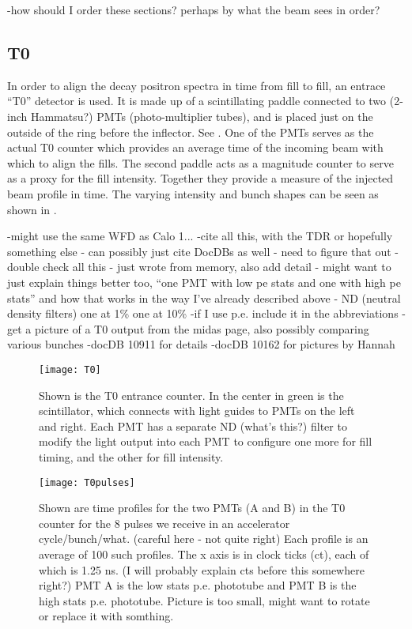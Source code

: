 -how should I order these sections? perhaps by what the beam sees in order?

\subsection{T0}
\label{sec:T0}

In order to align the decay positron spectra in time from fill to fill, an entrace ``T0'' detector is used.  It is made up of a scintillating paddle connected to two (2-inch Hammatsu?) PMTs (photo-multiplier tubes), and is placed just on the outside of the ring before the inflector. See . One of the PMTs serves as the actual T0 counter which provides an average time of the incoming beam with which to align the fills. The second paddle acts as a magnitude counter to serve as a proxy for the fill intensity. Together they provide a measure of the injected beam profile in time. The varying intensity and bunch shapes can be seen as shown in .

-might use the same WFD as Calo 1...
-cite all this, with the TDR or hopefully something else \cite{TDR} - can possibly just cite DocDBs as well - need to figure that out
-double check all this - just wrote from memory, also add detail - might want to just explain things better too, ``one PMT with low pe stats and one with high pe stats'' and how that works in the way I've already described above - ND (neutral density filters) one at 1\% one at 10\%
-if I use p.e. include it in the abbreviations
-get a picture of a T0 output from the midas page, also possibly comparing various bunches
-docDB 10911 for details
-docDB 10162 for pictures by Hannah


\begin{figure}[]
    \centering
    \texttt{[image: T0]}
    \caption[T0 Counter]{Shown is the T0 entrance counter. In the center in green is the scintillator, which connects with light guides to PMTs on the left and right. Each PMT has a separate ND (what's this?) filter to modify the light output into each PMT to configure one more for fill timing, and the other for fill intensity.}
    \label{fig:T0}
\end{figure}

\begin{figure}[]
    \centering
    \texttt{[image: T0pulses]}
    \caption[T0 Pulses]{Shown are time profiles for the two PMTs (A and B) in the T0 counter for the 8 pulses we receive in an accelerator cycle/bunch/what. (careful here - not quite right) Each profile is an average of 100 such profiles. The x axis is in clock ticks (ct), each of which is 1.25 ns. (I will probably explain cts before this somewhere right?) PMT A is the low stats p.e. phototube and PMT B is the high stats p.e. phototube. Picture is too small, might want to rotate or replace it with somthing.}
    \label{fig:T0pulses}
\end{figure}


